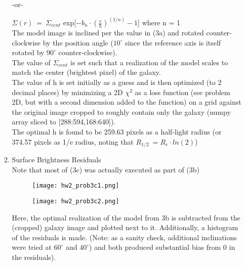 \documentclass[11pt]{article}
\begin{document}
\begin{enumerate}
\begin{enumerate}
   -or-
   
   \hspace{10mm} $\Sigma (r)\ =\ \Sigma _{cent}$ exp[$-b_n \cdot (\frac{\displaystyle  r}{\displaystyle  h})^{(1/n)}-1$] where n = 1 \\
  
   The model image is inclined per the value in (3a) and rotated counter-clockwise by the position angle ($10^{\circ}$ since the reference axis is itself rotated by $90^{\circ}$ counter-clockwise).\\
   
   The value of $\Sigma _{cent}$ is set such that a realization of the model scales to match the center (brightest pixel) of the galaxy.\\
   
   The value of h is set initially as a guess and is then optimized (to 2 decimal places) by minimizing a 2D $\chi^2$ as a loss function (see problem 2D, but with a second dimension added to the function) on a grid against the original image cropped to roughly contain only the galaxy (numpy array sliced to [288:594,168:640]). \\
   
   The optimal h is found to be 259.63 pixels as a half-light radius (or 374.57 pixels as 1/e radius, noting that $R_{1/2}\ = R_e \cdot ln(2)$)\\
   
   \item Surface Brightness Residuals\\ %
   
   Note that most of (3c) was actually executed as part of (3b)
   
       		\begin{figure}[H]
     		    \texttt{[image: hw2\_prob3c1.png]}
     		    \caption{}
     		    \label{}
        		\end{figure}
  

         		\begin{figure}[H]
         		\centering
       		    \texttt{[image: hw2\_prob3c2.png]}
       		    \caption{}
       		    \label{}
          		\end{figure}

  Here, the optimal realization of the model from 3b is subtracted from the (cropped) galaxy image and plotted next to it. Additionally, a histogram of the residuals is made. (Note: as a sanity check, additional inclinations were tried at $60^{\circ}$ and $40^{\circ}$) and both produced substantial bias from 0 in the residuals).\\
  

\end{enumerate}
\end{enumerate}
\end{document}
